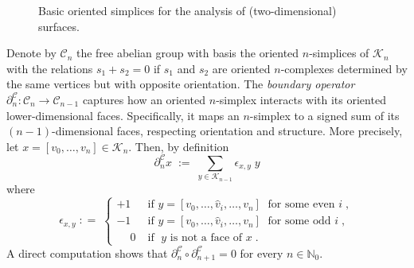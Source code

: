 \documentclass[a4paper,12pt,twoside,reqno]{amsart}
\theoremstyle{plain}
\theoremstyle{definition}
\theoremstyle{remark}
\numberwithin{equation}{section}
\numberwithin{figure}{section}
\numberwithin{table}{section}
\newcommand{\f}[1]{\mathcal{#1}}
\newcommand{\n}[1]{\mathbb{#1}}
\begin{document}
	
	\begin{figure}[H]
		\centering
		\caption{\label{fig:simplices}Basic oriented simplices for the analysis of (two-dimensional) surfaces.}
	\end{figure}
	
	
	
	
	\medskip
	
	
	
	
	Denote by $\f{C}_n$ the free abelian group with basis the oriented $n$-simplices of $\f{K}_n$
	with the relations $s_1+s_2=0$ if $s_1$ and $s_2$ are   oriented $n$-complexes determined by the same vertices but with opposite orientation. The \emph{boundary operator} $\partial_n^\f{C} : \f{C}_n \to \f{C}_{n-1}$ captures how an oriented $n$-simplex interacts with its oriented lower-dimensional faces. Specifically, it maps an $n$-simplex to a signed sum of its $(n{-}1)$-dimensional faces, respecting orientation and structure.
	More precisely, let $x=[v_0,\dots,v_n]\in \f{K}_n$. Then, by definition
	\begin{equation}\label{def:boundary}
		\partial_n^\f{C} x \;:=\; \sum_{y \in \f{K}_{n-1}} \epsilon_{x,y}\;  y
	\end{equation}
	where
	\[
	\epsilon_{x,y}\;: =\;
	\begin{cases}
		+1&\;  \text{if } y =[v_0, \dots, \hat{v}_i, \dots, v_n]\; \text{ for some even } i\;, \\
		-1&\;  \text{if } y =  [v_0, \dots, \hat{v}_i, \dots, v_n]\; \text{ for some odd } i\;, \\
		\phantom{+}0&\;  \text{if }\; y \text{ is not a face of } x\;.
	\end{cases}
	\]
	A direct computation shows that $\partial_n^\f{C}\circ   \partial_{n+1}^\f{C}=0$ for every $n\in\n{N}_0$.
	
\end{document}

